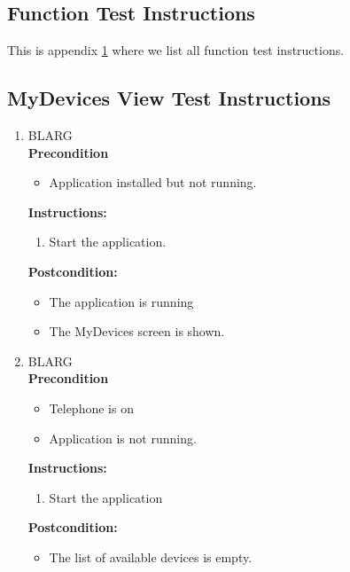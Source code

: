 \documentclass[a4paper]{article}
\newlength{\testlabellength}
\newenvironment{testlist}{\begin{enumerate}[label=\bfseries Instruction \thesubsection.\arabic* , labelindent=0pt, labelwidth=\testlabellength , leftmargin=2cm]}{\end{enumerate}}
\newenvironment{precondition}{
{\color{white}BLARG}\\ 
\textbf{Precondition}
\begin{itemize}[labelindent=0cm, labelwidth=2cm , leftmargin=1cm]
}
{\end{itemize}}
\newenvironment{instruction}{
\textbf{Instructions:}
\begin{enumerate}[label=\bfseries  \arabic*., labelindent=0cm, labelwidth=2cm , leftmargin=1cm]
}
{\end{enumerate}}
\newenvironment{postcondition}{
\textbf{Postcondition:}
\begin{itemize}[labelindent=0cm, labelwidth=2cm , leftmargin=1cm]
}
{\end{itemize}}
\begin{document}
\newpage
\begin{appendices}

\section{Function Test Instructions} \label{appendix:section:functiontest}
This is appendix \ref{appendix:section:functiontest} where we list all function test instructions.

\subsection{MyDevices View Test Instructions}
\begin{testlist}

    \item 
    	\begin{precondition}
    		\item Application installed but not running.
    	\end{precondition}
    	\begin{instruction}
			\item Start the application.
    	\end{instruction}
    	\begin{postcondition}
    		\item The application is running
    		\item The MyDevices screen is shown.
    	\end{postcondition}
    
	\item
		\begin{precondition}
			\item Telephone is on
			\item Application is not running.
    	\end{precondition}
    	\begin{instruction}
    		\item Start the application
    	\end{instruction}
    	\begin{postcondition}
    		\item The list of available devices is empty.
    	\end{postcondition}
    

\end{testlist}
\end{appendices}
\end{document}
